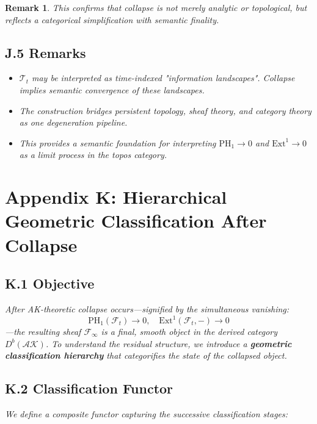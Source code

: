 \documentclass[11pt]{article}
\newtheorem{remark}[theorem]{Remark}
\begin{document}
\begin{remark}
This confirms that collapse is not merely analytic or topological, but reflects a categorical simplification with semantic finality.

\subsection*{J.5 Remarks}

\begin{itemize}
  \item $\mathscr{T}_t$ may be interpreted as time-indexed "information landscapes". Collapse implies semantic convergence of these landscapes.
  \item The construction bridges persistent topology, sheaf theory, and category theory as one degeneration pipeline.
  \item This provides a semantic foundation for interpreting $\mathrm{PH}_1 \to 0$ and $\mathrm{Ext}^1 \to 0$ as a limit process in the topos category.
\end{itemize}



\section*{Appendix K: Hierarchical Geometric Classification After Collapse}

\subsection*{K.1 Objective}

After AK-theoretic collapse occurs—signified by the simultaneous vanishing:
\[
\mathrm{PH}_1(\mathcal{F}_t) \to 0, \quad \mathrm{Ext}^1(\mathcal{F}_t, -) \to 0
\]
—the resulting sheaf $\mathcal{F}_\infty$ is a final, smooth object in the derived category $D^b(\mathcal{AK})$.  
To understand the residual structure, we introduce a \textbf{geometric classification hierarchy} that categorifies the state of the collapsed object.

\subsection*{K.2 Classification Functor}

We define a composite functor capturing the successive classification stages:


\end{remark}
\end{document}
